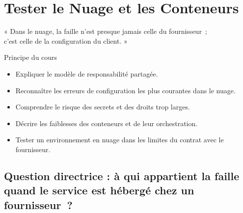 
\chapter{Tester le Nuage et les Conteneurs}
\label{chap:nuage}

\epigraph{%
    « Dans le nuage, la faille n'est presque jamais celle du fournisseur~;\\
    c'est celle de la configuration du client. »%
}{Principe du cours}


\begin{boxobjectifs}
\begin{itemize}
    \item Expliquer le modèle de responsabilité partagée.
    \item Reconnaître les erreurs de configuration les plus courantes dans
          le nuage.
    \item Comprendre le risque des secrets et des droits trop larges.
    \item Décrire les faiblesses des conteneurs et de leur orchestration.
    \item Tester un environnement en nuage dans les limites du contrat avec
          le fournisseur.
\end{itemize}
\end{boxobjectifs}

\bigskip

\section*{Question directrice : à qui appartient la faille quand le service est hébergé chez un fournisseur~?}

